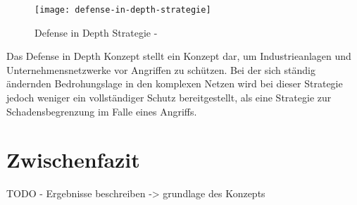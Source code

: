 \begin{figure}[h]
    \centering
    \texttt{[image: defense-in-depth-strategie]}
    \caption{Defense in Depth Strategie - \cite{kuipers2006}}
    \label{Kap3:Defense-in-Depth}
\end{figure}

\clearpage

Das Defense in Depth Konzept stellt ein Konzept dar, um Industrieanlagen und Unternehmensnetzwerke vor Angriffen zu schützen. Bei der sich ständig ändernden Bedrohungslage in den komplexen Netzen wird bei dieser Strategie jedoch weniger ein vollständiger Schutz bereitgestellt, als eine Strategie zur Schadensbegrenzung im Falle eines Angriffs.


\section{Zwischenfazit}
TODO - Ergebnisse beschreiben -> grundlage des Konzepts